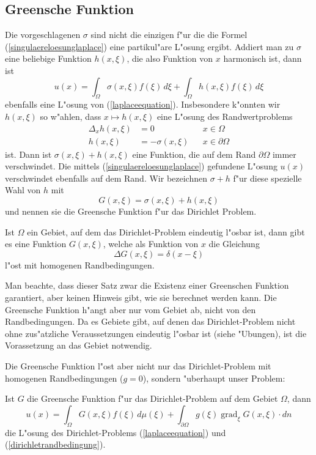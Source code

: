 \subsection{Greensche Funktion}
Die vorgeschlagenen $\sigma$ sind nicht die einzigen f"ur die die
Formel (\ref{singulaereloesunglaplace}) eine partikul"are L"osung ergibt.
Addiert man zu $\sigma$ eine beliebige Funktion $h(x,\xi)$, die
also Funktion von $x$ harmonisch ist, dann ist
\[
u(x)=\int_{\Omega}\sigma(x,\xi)f(\xi)\,d\xi+\int_{\Omega}h(x,\xi)f(\xi)\,d\xi
\]
ebenfalls eine L"osung von (\ref{laplaceequation}). Insbesondere
k"onnten wir $h(x,\xi)$ so w"ahlen, dass
$x\mapsto h(x,\xi)$ eine L"osung des Randwertproblems
\begin{align*}
\Delta_x h(x,\xi)&=0&&x\in\Omega\\
h(x,\xi)&=-\sigma(x,\xi)&&x\in\partial\Omega
\end{align*}
ist. Dann ist $\sigma(x,\xi)+h(x,\xi)$ eine Funktion, die auf dem
Rand $\partial\Omega$ immer verschwindet. Die mittels
(\ref{singulaereloesunglaplace}) gefundene L"osung $u(x)$
verschwindet ebenfalls auf dem Rand.
Wir bezeichnen $\sigma+h$ f"ur diese spezielle Wahl von $h$ mit
\[
G(x,\xi)=\sigma(x,\xi)+h(x,\xi)
\]
und nennen sie die Greensche Funktion f"ur das Dirichlet Problem.

\begin{satz}Ist $\Omega$ ein Gebiet, auf dem das Dirichlet-Problem
eindeutig l"osbar ist, dann gibt es eine 
Funktion $G(x,\xi)$,
welche als Funktion von $x$ die Gleichung
\[
\Delta G(x,\xi)=\delta(x-\xi)
\]
l"ost mit homogenen Randbedingungen.
\end{satz}

Man beachte, dass dieser Satz zwar die Existenz einer Greenschen Funktion
garantiert, aber keinen Hinweis gibt, wie sie berechnet werden kann.
Die Greensche Funktion h"angt aber nur vom Gebiet ab, nicht von den
Randbedingungen.
Da es Gebiete gibt, auf denen das Dirichlet-Problem nicht ohne zus"atzliche
Veraussetzungen eindeutig l"osbar ist (siehe "Ubungen), ist die
Vorassetzung an das Gebiet notwendig.

Die Greensche Funktion l"ost aber nicht nur das Dirichlet-Problem
mit homogenen Randbedingungen ($g=0$), sondern "uberhaupt
unser Problem:

\begin{satz}
\label{dirichletloesung}
Ist $G$ die Greensche Funktion f"ur das Dirichlet-Problem auf dem
Gebiet $\Omega$, dann
\[
u(x)=\int_{\Omega}G(x,\xi)f(\xi)\,d\mu(\xi)+\int_{\partial\Omega}g(\xi)\operatorname{grad}_\xi G(x,\xi)\cdot dn
\]
die L"osung des Dirichlet-Problems (\ref{laplaceequation}) und
(\ref{dirichletrandbedingung}).
\end{satz}


